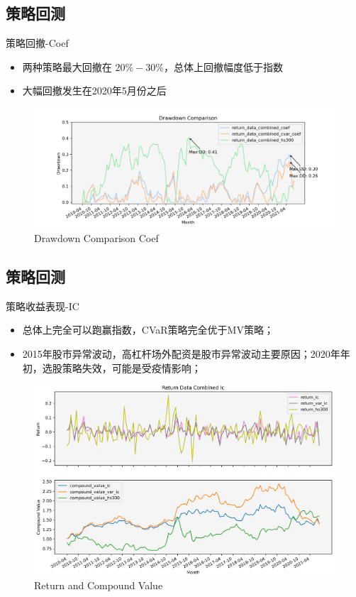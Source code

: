 \documentclass[CJK,aspectratio=43]{beamer}  %
\begin{document}
\subsection{策略回测}
\begin{frame}{策略回撤-Coef}
	\begin{itemize}
		\item 两种策略最大回撤在 $20\%-30\%$，总体上回撤幅度低于指数
		\item 大幅回撤发生在2020年5月份之后
	\end{itemize}
	\begin{figure}
		\centering
		\includegraphics[width=1\linewidth]{"pic/Drawdown_Comparison_Coef"}
		\caption{Drawdown Comparison Coef}
		\label{fig:coefdramdown}
	\end{figure}
\end{frame}

\subsection{策略回测}
\begin{frame}{策略收益表现-IC}
	\begin{itemize}
		\item 总体上完全可以跑赢指数，CVaR策略完全优于MV策略；
		\item 2015年股市异常波动，高杠杆场外配资是股市异常波动主要原因；2020年年初，选股策略失效，可能是受疫情影响；
	\end{itemize}
	\begin{figure}
		\centering
		\includegraphics[width=0.79\linewidth]{pic/IC}
		\caption{Return and Compound Value}
		\label{fig:ic}
	\end{figure}
\end{frame}
\end{document}
